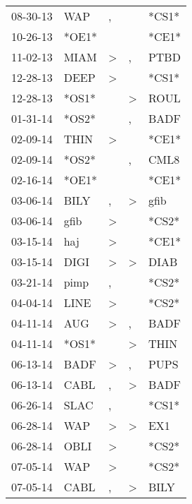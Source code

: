 \begin{supertabular}{lllll}
 08-30-13 &    WAP &                , &                  &  *CS1* \\
 10-26-13 &  *OE1* &                  &                  &  *CE1* \\
 11-02-13 &   MIAM &     \textgreater &                , &   PTBD \\
 12-28-13 &   DEEP &     \textgreater &                  &  *CS1* \\
 12-28-13 &  *OS1* &                  &     \textgreater &   ROUL \\
 01-31-14 &  *OS2* &                  &                , &   BADF \\
 02-09-14 &   THIN &     \textgreater &                  &  *CE1* \\
 02-09-14 &  *OS2* &                  &                , &   CML8 \\
 02-16-14 &  *OE1* &                  &                  &  *CE1* \\
 03-06-14 &   BILY &                , &     \textgreater &   gfib \\
 03-06-14 &   gfib &     \textgreater &                  &  *CS2* \\
 03-15-14 &    haj &     \textgreater &                  &  *CE1* \\
 03-15-14 &   DIGI &     \textgreater &     \textgreater &   DIAB \\
 03-21-14 &   pimp &                , &                  &  *CS2* \\
 04-04-14 &   LINE &     \textgreater &                  &  *CS2* \\
 04-11-14 &    AUG &     \textgreater &                , &   BADF \\
 04-11-14 &  *OS1* &                  &     \textgreater &   THIN \\
 06-13-14 &   BADF &     \textgreater &                , &   PUPS \\
 06-13-14 &   CABL &                , &     \textgreater &   BADF \\
 06-26-14 &   SLAC &                , &                  &  *CS1* \\
 06-28-14 &    WAP &     \textgreater &     \textgreater &    EX1 \\
 06-28-14 &   OBLI &     \textgreater &                  &  *CS2* \\
 07-05-14 &    WAP &     \textgreater &                  &  *CS2* \\
 07-05-14 &   CABL &                , &     \textgreater &   BILY \\

\end{supertabular}
